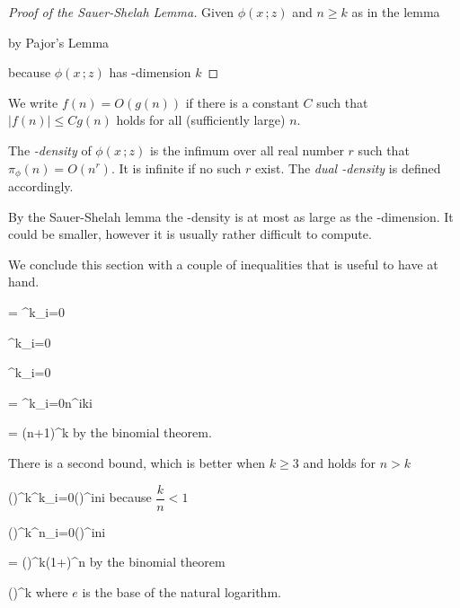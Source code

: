 \documentclass[scombinatorics.tex]{subfiles}
\begin{document}
\begin{proof}[Proof of the Sauer-Shelah Lemma]
  Given $\phi(x\,;z)$ and $n\ge k$ as in the lemma

  \smallskip

  \hfill by  Pajor's Lemma\smallskip
  
  \hfill because $\phi(x\,;z)$ has \vc-dimension $k$
\end{proof}

We write $f(n)=O(g(n))$ if there is a constant $C$ such that $|f(n)|\le C g(n)$ holds for all (sufficiently large) $n$.

The \emph{\vc-density\/} of $\phi(x\,;z)$ is the infimum over all real number $r$ such that $\pi_\phi(n)= O(n^r)$.
It is infinite if no such $r$ exist.
The  \emph{dual \vc-density\/} is defined accordingly.

By the Sauer-Shelah lemma the \vc-density is at most as large as the \vc-dimension.
It could be smaller, however it is usually rather difficult to compute.

We conclude this section with a couple of inequalities that is useful to have at hand.

{=}
{\sum^k_{i=0}}

\ceq{}
{\le}
{\sum^k_{i=0}}

\ceq{}
{\le}
{\sum^k_{i=0}}

\ceq{}
{=}
{\sum^k_{i=0}n^i{k\choose i}}

\ceq{}
{=}
{(n+1)^k}
\hfill by the binomial theorem.\smallskip

There is a second bound, which is better when $k\ge 3$ and holds for $n>k$

{\le}
{\Big(\Big)^{\!k}\sum^k_{i=0}\Big(\Big)^{\!i}{n\choose i}}
\hfill because $\dfrac{k}{n}<1$

\ceq{}
{\le}
{\Big(\Big)^{\!k}\sum^n_{i=0}\Big(\Big)^{\!i}{n\choose i}}

\ceq{}
{=}
{\Big(\Big)^{\!k}\Big(1+\Big)^n}
\hfill by the binomial theorem

\ceq{}
{\le}
{\Big(\Big)^{\!k}}
\hfill where $e$ is the base of the natural logarithm.
\end{document}
